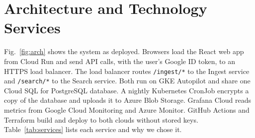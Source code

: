 \documentclass[conference]{IEEEtran}
\begin{document}
\section{Architecture and Technology Services}
\label{sec:arch}

Fig.~\ref{fig:arch} shows the system as deployed. Browsers load the React
web app from Cloud Run and send API calls, with the user's Google ID token,
to an HTTPS load balancer. The load balancer routes \texttt{/ingest/*} to
the Ingest service and \texttt{/search/*} to the Search service. Both run
on GKE Autopilot and share one Cloud SQL for PostgreSQL database. A nightly
Kubernetes CronJob encrypts a copy of the database and uploads it to Azure
Blob Storage. Grafana Cloud reads metrics from Google Cloud Monitoring and
Azure Monitor. GitHub Actions and Terraform build and deploy to both clouds
without stored keys. Table~\ref{tab:services} lists each service and why we
chose it.
\end{document}
